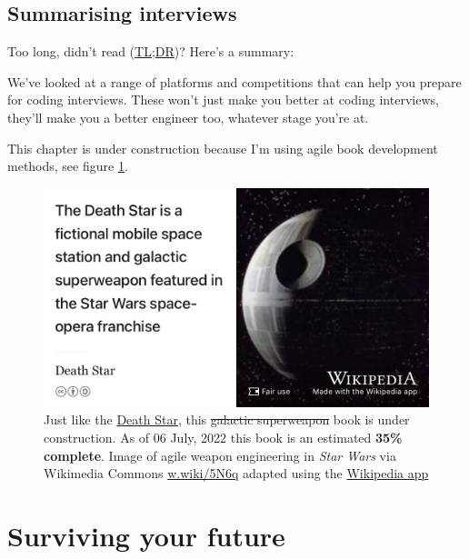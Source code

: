 \documentclass[
]{book}
\begin{document}
\hypertarget{tldr9}{%
\section{Summarising interviews}\label{tldr9}}

Too long, didn't read (\href{https://en.wiktionary.org/wiki/too_long;_didn\%27t_read}{TL;DR})? Here's a summary:

We've looked at a range of platforms and competitions that can help you prepare for coding interviews. These won't just make you better at coding interviews, they'll make you a better engineer too, whatever stage you're at.

This chapter is under construction because I'm using agile book development methods, see figure \ref{fig:deathstar6-fig}.

\begin{figure}

{\centering \includegraphics[width=0.99\linewidth]{images/DeathStar2} 

}

\caption{Just like the \href{https://en.wikipedia.org/wiki/Death_Star}{Death Star}, this \sout{galactic superweapon} book is under construction. As of 06 July, 2022 this book is an estimated \textbf{35\% complete}. Image of agile weapon engineering in \emph{Star Wars} via Wikimedia Commons \href{https://w.wiki/5N6q}{w.wiki/5N6q} adapted using the \href{https://apps.apple.com/gb/app/wikipedia/id324715238}{Wikipedia app}}\label{fig:deathstar6-fig}
\end{figure}

\hypertarget{surviving}{%
\chapter{Surviving your future}\label{surviving}}
\end{document}
